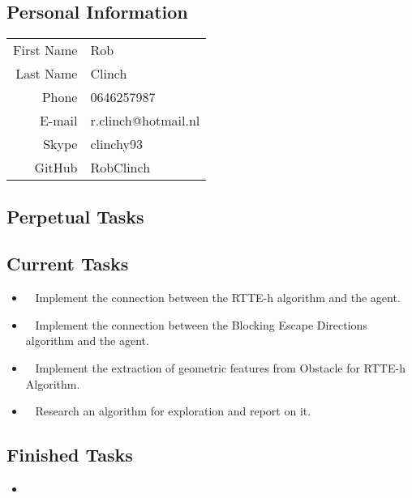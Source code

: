 \subsection{Personal Information}
\begin{table}[h!]
	\begin{tabular}{rl}
	First Name 	& Rob\\
	Last Name	& Clinch\\
	Phone		& 0646257987\\
	E-mail		& r.clinch@hotmail.nl\\
	Skype		& clinchy93\\
	GitHub		& RobClinch
\end{tabular}
\end{table}

\subsection{Perpetual Tasks}

\subsection{Current Tasks}
\begin{itemize}
	\item~
	Implement the connection between the RTTE-h algorithm and the agent.
	\item~
	Implement the connection between the Blocking Escape Directions algorithm and the agent.
	\item~
	Implement the extraction of geometric features from Obstacle for RTTE-h Algorithm.
	\item~
	Research an algorithm for exploration and report on it.
\end{itemize}

\subsection{Finished Tasks}
\begin{itemize}
\item
\end{itemize}
